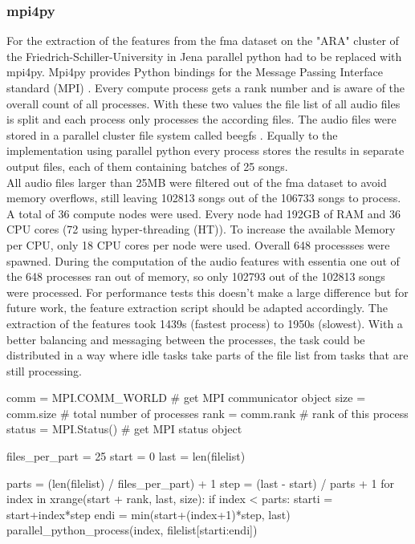 \subsubsection{mpi4py}

For the extraction of the features from the fma dataset on the "ARA" cluster of the Friedrich-Schiller-University in Jena parallel python had to be replaced with mpi4py. 
Mpi4py provides Python bindings for the Message Passing Interface standard (MPI) \cite{mpi4py}. 
Every compute process gets a rank number and is aware of the overall count of all processes. With these two values the file list of all audio files is split and each process only processes the according files. The audio files were stored in a parallel cluster file system called beegfs \cite{beegfs}. Equally to the implementation using parallel python every process stores the results in separate output files, each of them containing batches of 25 songs.\\
All audio files larger than 25MB were filtered out of the fma dataset to avoid memory overflows, still leaving 102813 songs out of the 106733 songs to process. A total of 36 compute nodes were used. Every node had 192GB of RAM and 36 CPU cores (72 using hyper-threading (HT)). To increase the available Memory per CPU, only 18 CPU cores per node were used. Overall 648 processses were spawned. During the computation of the audio features with essentia one out of the 648 processes ran out of memory, so only 102793 out of the 102813 songs were processed. For performance tests this doesn't make a large difference but for future work, the feature extraction script should be adapted accordingly. 
The extraction of the features took 1439s (fastest process) to 1950s (slowest). With a better balancing and messaging between the processes, the task could be distributed in a way where idle tasks take parts of the file list from tasks that are still processing. 

\begin{pythonCode}[frame=single,label={lst:mpi4py},caption={mpi4py},captionpos=b]
comm = MPI.COMM_WORLD   # get MPI communicator object
size = comm.size        # total number of processes
rank = comm.rank        # rank of this process
status = MPI.Status()   # get MPI status object

files_per_part = 25
start = 0
last = len(filelist)

parts = (len(filelist) / files_per_part) + 1
step = (last - start) / parts + 1
for index in xrange(start + rank, last, size):
    if index < parts:        
        starti = start+index*step
        endi = min(start+(index+1)*step, last)
        parallel_python_process(index, filelist[starti:endi])
\end{pythonCode}

